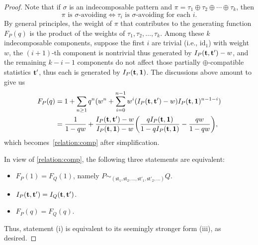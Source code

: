 \documentclass[12pt]{amsart}
\numberwithin{equation}{section}
\theoremstyle{plain}
\newtheorem{lemma}[theorem]{Lemma}
\theoremstyle{definition}
\def\S{\mathfrak{S}}
\def\comp{\mathsf{comp}}
\def\st{\mathsf{st}}
\def\id{\mathrm{id}}
\begin{document}
\begin{proof}
Note that if $\sigma$ is an indecomposable pattern and $\pi=\tau_1\oplus\tau_2\oplus\cdots\oplus\tau_k$,  then
$$
\pi \text{ is $\sigma$-avoiding}\Longleftrightarrow \tau_i\text{ is $\sigma$-avoiding for each $i$}. 
$$
By general principles, the weight of $\pi$ that contributes to the generating function $F_P(q)$ is the product of the weights of $\tau_1,\tau_2,\ldots,\tau_k$. Among these $k$ indecomposable components, suppose the first $i$ are trivial (i.e., $\id_1$) with weight $w$, the $(i+1)$-th component is nontrivial thus generated by $I_P({\bf t},{\bf t'})-w$, and the remaining $k-i-1$ components do not affect those partially $\oplus$-compatible statistics ${\bf t'}$, thus each is generated by $I_P({\bf t},{\bf 1})$. The discussions above amount to give us 
\begin{align*}
F_P(q)&=1+\sum_{n\geq1} q^n(w^n+\sum_{i=0}^{n-1}w^i(I_P({\bf t}, {\bf t'})-w)I_P({\bf t},{\bf 1})^{n-1-i})\\
&=\frac{1}{1-qw}+\frac{I_P({\bf t}, {\bf t'})-w}{I_P({\bf t},{\bf 1})-w}\biggl(\frac{qI_P({\bf t},{\bf 1})}{1-qI_P({\bf t},{\bf 1})}-\frac{qw}{1-qw}\biggr),
\end{align*}
which becomes~\eqref{relation:comp}  after simplification.

In view of \eqref{relation:comp}, the following three statements are equivalent: 
\begin{itemize}
\item [(i)] $F_P(1)=F_Q(1)$, namely $P\sim_{(\st_1,\st_2,\ldots,\st'_1,\st'_2,\ldots)}Q$.
\item [(ii)] $I_P({\bf t}, {\bf t'})=I_Q({\bf t}, {\bf t'})$. 
\item [(iii)] $F_P(q)=F_Q(q)$. 
\end{itemize}
Thus, statement (i) is equivalent to its seemingly stronger form  (iii), as desired. 
\end{proof}

\end{document}
